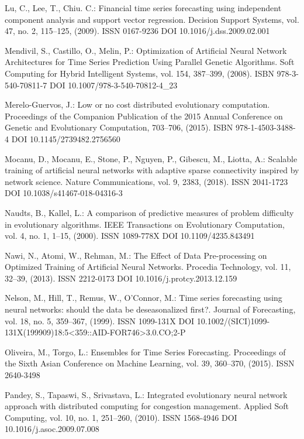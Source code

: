 \begin{thebibliography}{99.}
 Lu, C., Lee, T., Chiu. C.: Financial time series forecasting using independent component analysis and support vector regression. Decision Support Systems, vol. 47, no. 2, 115--125, (2009). ISSN 0167-9236 DOI 10.1016/j.dss.2009.02.001

 Mendivil, S., Castillo, O., Melin, P.: Optimization of Artificial Neural Network Architectures for Time Series Prediction Using Parallel Genetic Algorithms. Soft Computing for Hybrid Intelligent Systems, vol. 154, 387--399, (2008). ISBN 978-3-540-70811-7 DOI 10.1007/978-3-540-70812-4\_23

 Merelo-Guervos, J.: Low or no cost distributed evolutionary computation. Proceedings of the Companion Publication of the 2015 Annual Conference on Genetic and Evolutionary Computation, 703--706, (2015). ISBN 978-1-4503-3488-4 DOI 10.1145/2739482.2756560

 Mocanu, D., Mocanu, E., Stone, P., Nguyen, P., Gibescu, M., Liotta, A.: Scalable training of artificial neural networks with adaptive sparse connectivity inspired by network science. Nature Communications, vol. 9, 2383, (2018). ISSN 2041-1723 DOI 10.1038/s41467-018-04316-3

 Naudts, B., Kallel, L.: A comparison of predictive measures of problem difficulty in evolutionary algorithms. IEEE Transactions on Evolutionary Computation, vol. 4, no. 1, 1--15, (2000). ISSN 1089-778X DOI 10.1109/4235.843491

 Nawi, N., Atomi, W., Rehman, M.: The Effect of Data Pre-processing on Optimized Training of Artificial Neural Networks. Procedia Technology, vol. 11, 32--39, (2013). ISSN 2212-0173 DOI 10.1016/j.protcy.2013.12.159

 Nelson, M., Hill, T., Remus, W., O'Connor, M.: Time series forecasting using neural networks: should the data be deseasonalized first?. Journal of Forecasting, vol. 18, no. 5, 359--367, (1999). ISSN 1099-131X DOI 10.1002/(SICI)1099-131X(199909)18:5<359::AID-FOR746>3.0.CO;2-P

 Oliveira, M., Torgo, L.: Ensembles for Time Series Forecasting. Proceedings of the Sixth Asian Conference on Machine Learning, vol. 39, 360--370, (2015). ISSN 2640-3498

 Pandey, S., Tapaswi, S., Srivastava, L.: Integrated evolutionary neural network approach with distributed computing for congestion management. Applied Soft Computing, vol. 10, no. 1, 251--260, (2010). ISSN 1568-4946 DOI 10.1016/j.asoc.2009.07.008


\end{thebibliography}

